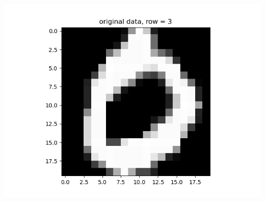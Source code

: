 \documentclass{article}
\begin{document}
\begin{enumerate}
\begin{enumerate}
\begin{center}
			\includegraphics[scale=.4]{hw3 orig, row = 3}
			

\end{center}
\end{enumerate}
\end{enumerate}
\end{document}
